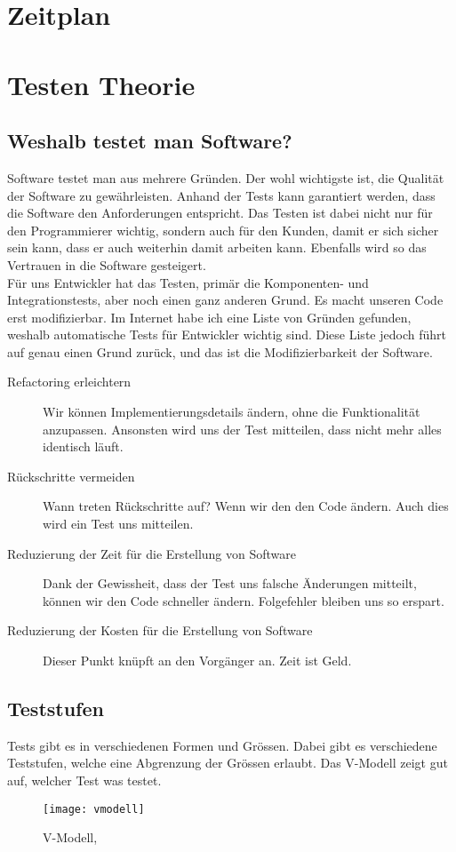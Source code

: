 \section{Zeitplan} \label{Zeitplan}

\section{Testen Theorie} \label{Testen Theorie}
\subsection{Weshalb testet man Software?}
Software testet man aus mehrere Gründen. Der wohl wichtigste ist, die Qualität der Software zu gewährleisten. Anhand der Tests kann garantiert werden, dass die Software den Anforderungen entspricht. Das Testen ist dabei nicht nur für den Programmierer wichtig, sondern auch für den Kunden, damit er sich sicher sein kann, dass er auch weiterhin damit arbeiten kann. Ebenfalls wird so das Vertrauen in die Software gesteigert. \\
Für uns Entwickler hat das Testen, primär die Komponenten- und Integrationstests, aber noch einen ganz anderen Grund. Es macht unseren Code erst modifizierbar. Im Internet habe ich eine Liste von Gründen gefunden, weshalb automatische Tests für Entwickler wichtig sind. Diese Liste jedoch führt auf genau einen Grund zurück, und das ist die Modifizierbarkeit der Software.
\begin{description}
	\item[Refactoring erleichtern] Wir können Implementierungsdetails ändern, ohne die Funktionalität anzupassen. Ansonsten wird uns der Test mitteilen, dass nicht mehr alles identisch läuft.
	\item[Rückschritte vermeiden] Wann treten Rückschritte auf? Wenn wir den den Code ändern. Auch dies wird ein Test uns mitteilen.
	\item[Reduzierung der Zeit für die Erstellung von Software] Dank der Gewissheit, dass der Test uns falsche Änderungen mitteilt, können wir den Code schneller ändern. Folgefehler bleiben uns so erspart.
	\item[Reduzierung der Kosten für die Erstellung von Software] Dieser Punkt knüpft an den Vorgänger an. Zeit ist Geld.
\end{description}

\subsection{Teststufen}
Tests gibt es in verschiedenen Formen und Grössen. Dabei gibt es verschiedene Teststufen, welche eine Abgrenzung der Grössen erlaubt. Das V-Modell zeigt gut auf, welcher Test was testet.
\begin{figure}[H]
	\centering
	\texttt{[image: vmodell]}
	\caption{V-Modell, \cite{wiki:vmodellimage}}
\end{figure}

